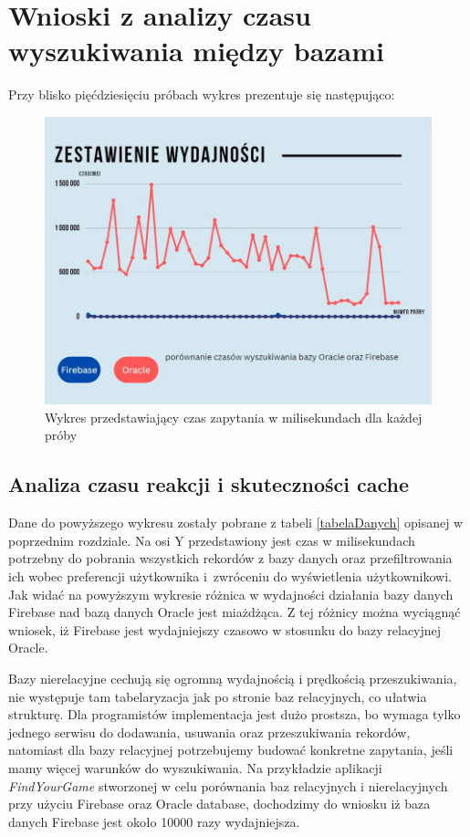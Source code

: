 \section{Wnioski z analizy czasu wyszukiwania między bazami}
Przy blisko pięćdziesięciu próbach wykres prezentuje się następująco:
\begin{figure}[h]
    \centering
    \includegraphics[width=0.8\linewidth]{./img/wykres.jpg}
    \caption{Wykres przedstawiający czas zapytania w milisekundach dla każdej próby}
    \label{fig:Wykres}
\end{figure}

\subsection{Analiza czasu reakcji i skuteczności cache}
Dane do powyższego wykresu zostały pobrane z tabeli \ref{tabelaDanych} opisanej w poprzednim rozdziale. Na osi Y przedstawiony jest czas w milisekundach potrzebny do pobrania wszystkich rekordów z bazy danych oraz przefiltrowania ich wobec preferencji użytkownika i~zwróceniu do wyświetlenia użytkownikowi. Jak widać na powyższym wykresie różnica w wydajności działania bazy danych Firebase nad bazą danych Oracle jest miażdżąca. Z tej różnicy można wyciągnąć wniosek, iż Firebase jest wydajniejszy czasowo w stosunku do bazy relacyjnej Oracle.

Bazy nierelacyjne cechują się ogromną wydajnością i prędkością przeszukiwania, nie występuje tam tabelaryzacja jak po stronie baz relacyjnych, co ułatwia strukturę. Dla programistów implementacja jest dużo prostsza, bo wymaga tylko jednego serwisu do dodawania, usuwania oraz przeszukiwania rekordów, natomiast dla bazy relacyjnej potrzebujemy budować konkretne zapytania, jeśli mamy więcej warunków do wyszukiwania. Na przykładzie aplikacji \textit{FindYourGame} stworzonej w celu porównania baz relacyjnych i nierelacyjnych przy użyciu Firebase oraz Oracle database, dochodzimy do wniosku iż baza danych Firebase jest około 10000 razy wydajniejsza.

